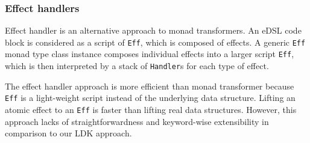 \subsubsection{Effect handlers}\label{Effect handlers}

Effect handler \cite{kiselyov2013extensible} is an alternative approach to monad transformers. An eDSL code block is considered as a script of \lstinline{Eff}, which is composed of effects. A generic \lstinline{Eff} monad type class instance composes individual effects into a larger script \lstinline{Eff}, which is then interpreted by a stack of \lstinline{Handler}s for each type of effect.

The effect handler approach is more efficient than monad transformer because \lstinline{Eff} is a light-weight script instead of the underlying data structure. Lifting an atomic effect to an \lstinline{Eff} is faster than lifting real data structures. However, this approach lacks of straightforwardness and keyword-wise extensibility in comparison to our LDK approach.

